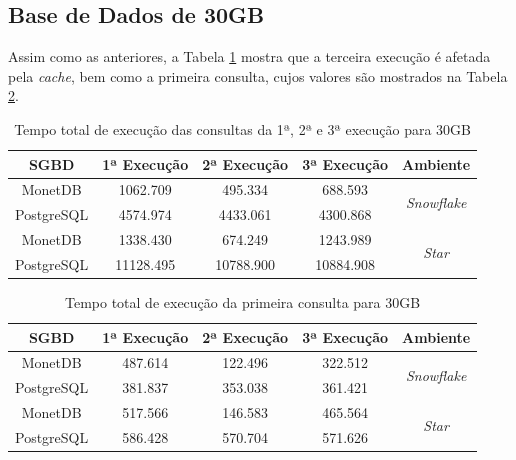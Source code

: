 \subsection{Base de Dados de 30GB}

Assim como as anteriores, a Tabela \ref{tab:queries_cache_30} mostra que a terceira execução é afetada pela \textit{cache}, bem como a primeira consulta, cujos valores são mostrados na Tabela \ref{tab:q1_cache_30}.

\begin{table}[htpb]
        \centering
        \caption{Tempo total de execução das consultas da 1ª, 2ª e 3ª execução para 30GB}
        \label{tab:queries_cache_30}
        \begin{tabular}{|c|c|c|c|c|}
        \hline
        SGBD       & 1ª Execução & 2ª Execução & 3ª Execução & Ambiente                            \\ \hline
        MonetDB    & 1062.709    & 495.334     & 688.593     & \multirow{2}{*}{\textit{Snowflake}} \\ \cline{1-4}
        PostgreSQL & 4574.974    & 4433.061    & 4300.868    &                                     \\ \hline
        MonetDB    & 1338.430    & 674.249     & 1243.989    & \multirow{2}{*}{\textit{Star}}      \\ \cline{1-4}
        PostgreSQL & 11128.495   & 10788.900   & 10884.908   &                                     \\ \hline
        \end{tabular}
\end{table}

\begin{table}[htpb]
        \centering
        \caption{Tempo total de execução da primeira consulta para 30GB}
        \label{tab:q1_cache_30}
        \begin{tabular}{|c|c|c|c|c|}
        \hline
        SGBD       & 1ª Execução & 2ª Execução & 3ª Execução & Ambiente                            \\ \hline
        MonetDB    & 487.614     & 122.496     & 322.512     & \multirow{2}{*}{\textit{Snowflake}} \\ \cline{1-4}
        PostgreSQL & 381.837     & 353.038     & 361.421     &                                     \\ \hline
        MonetDB    & 517.566     & 146.583     & 465.564     & \multirow{2}{*}{\textit{Star}}      \\ \cline{1-4}
        PostgreSQL & 586.428     & 570.704     & 571.626     &                                     \\ \hline
        \end{tabular}
\end{table}

